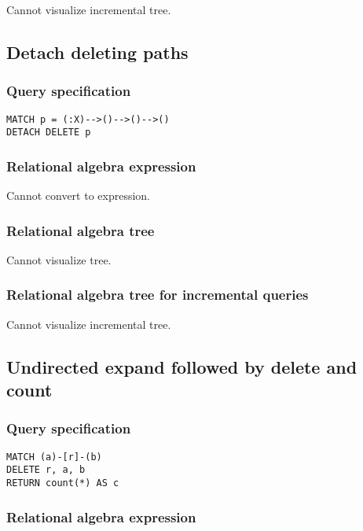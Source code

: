 Cannot visualize incremental tree.

\subsection{Detach deleting paths}

\subsubsection*{Query specification}

\begin{lstlisting}
MATCH p = (:X)-->()-->()-->()
DETACH DELETE p
\end{lstlisting}

\subsubsection*{Relational algebra expression}

Cannot convert to expression.

\subsubsection*{Relational algebra tree}

Cannot visualize tree.

\subsubsection*{Relational algebra tree for incremental queries}

Cannot visualize incremental tree.

\subsection{Undirected expand followed by delete and count}

\subsubsection*{Query specification}

\begin{lstlisting}
MATCH (a)-[r]-(b)
DELETE r, a, b
RETURN count(*) AS c
\end{lstlisting}

\subsubsection*{Relational algebra expression}

